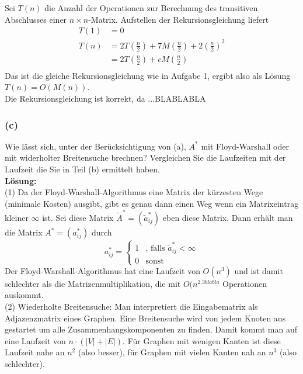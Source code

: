 \documentclass[11pt,a4paper,ngerman]{article}
\begin{document}
Sei $T(n)$ die Anzahl der Operationen zur Berechnung des transitiven Abschlusses einer $n \times n$-Matrix.
Aufstellen der Rekursionsgleichung liefert
\begin{equation*}\begin{split}
T(1) &= 0 \\
T(n) &= 2T\left(\frac{n}{2} \right) + 7M(\frac{n}{2}) + 2\left(\frac{n}{2}\right)^2 \\
     &= 2T\left(\frac{n}{2} \right) + cM(\frac{n}{2})  \\
\end{split}\end{equation*}
Das ist die gleiche Rekursionsgleichung wie in Aufgabe 1, ergibt also als Lösung $T(n) = O(M(n))$. \\

Die Rekursionsgleichung ist korrekt, da ...BLABLABLA
\subsubsection*{(c)}
Wie lässt sich, unter der Berücksichtigung von (a), $A^*$ mit Floyd-Warshall oder mit widerholter Breitensuche brechnen?
Vergleichen Sie die Laufzeiten mit der Laufzeit die Sie in Teil (b) ermittelt haben.\\

\textbf{Lösung:}\\
(1) Da der Floyd-Warshall-Algorithmus eine Matrix der kürzesten Wege (minimale Kosten) ausgibt, gibt es
genau dann einen Weg wenn ein Matrixeintrag kleiner $\infty$ ist.
Sei diese Matrix $\tilde{A}^* = (\tilde{a}^*_{ij})$ eben diese Matrix. Dann erhält man die Matrix $A^* = (a^*_{ij})$ durch
\begin{equation*}
a^*_{ij} = \begin{cases}
              1 & \text{, falls $\tilde{a}^*_{ij} < \infty$} \\
              0 & \text{sonst}
            \end{cases}
\end{equation*}
Der Floyd-Warshall-Algorithmus hat eine Laufzeit von $O(n^3)$ und ist damit schlechter als die Matrizenmultiplikation, die mit $O(n^{2.3blabla}$ Operationen auskommt.\\
(2) Wiederholte Breitensuche:  Man interpretiert die Eingabematrix als Adjazenzmatrix eines Graphen. Eine Breitensuche wird von jedem Knoten aus gestartet um alle
Zusammenhangskomponenten zu finden. Damit kommt man auf eine Laufzeit von $n \cdot (|V| +|E|)$.
Für Graphen mit wenigen Kanten ist diese Laufzeit nahe an $n^2$ (also besser), für Graphen mit vielen Kanten nah an $n^3$ (also schlechter).
\end{document}

